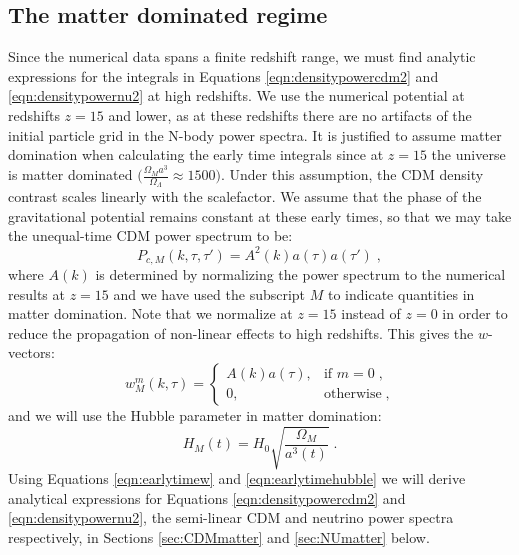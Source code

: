 \documentclass{aastex}
\begin{document}
\subsection{ The matter dominated regime}
Since the numerical data spans a finite redshift range, 
we must find analytic expressions for the integrals in Equations 
\eqref{eqn:densitypowercdm2} and 
\eqref{eqn:densitypowernu2} at high redshifts.
We use the numerical potential at redshifts $z=15$ and
lower, as at these
redshifts there are no artifacts of the initial particle grid in the
N-body power spectra.  
It is justified to assume matter domination when calculating the early
time integrals since at $z=15$ the universe
is matter dominated $\bigg(\frac{\Omega_M a^3}{\Omega_\Lambda} \approx
1500\bigg)$.  Under this
assumption, the CDM density contrast scales linearly with the
scalefactor.  We assume that the phase of the
gravitational potential remains constant at these early times, so
that we may take the unequal-time CDM power spectrum to be:
\begin{equation}\label{eqn:earlytimespectrum}
  P_{c,M}(k, \tau,\tau') = A^2(k) a(\tau) a(\tau') \;,
\end{equation}
where $A(k)$ is determined by
normalizing the power spectrum to the numerical results at $z=15$ and
we have used the subscript $M$ to indicate quantities in matter domination.  Note that we normalize at
$z=15$ instead of $z=0$ in order to reduce the propagation of non-linear
effects to high redshifts. 
This gives the $w$-vectors:
\begin{equation}\label{eqn:earlytimew}
  w_M^m(k,\tau) = 
  \begin{cases} 
    A(k) a(\tau), & \text{if } m = 0\;, \\
    0, & \text{otherwise} \;,
  \end{cases}
\end{equation}
and we will use the Hubble parameter in
matter domination:
\begin{equation}\label{eqn:earlytimehubble}
  H_M(t) = H_0 \sqrt{ \frac{\Omega_M}{a^3(t)} }\;.
\end{equation}
Using Equations \eqref{eqn:earlytimew} and
\eqref{eqn:earlytimehubble} we will derive analytical expressions for
Equations \eqref{eqn:densitypowercdm2} and \eqref{eqn:densitypowernu2},
the semi-linear CDM and neutrino power spectra respectively, in Sections
\ref{sec:CDMmatter} and \ref{sec:NUmatter} below.
\end{document}
